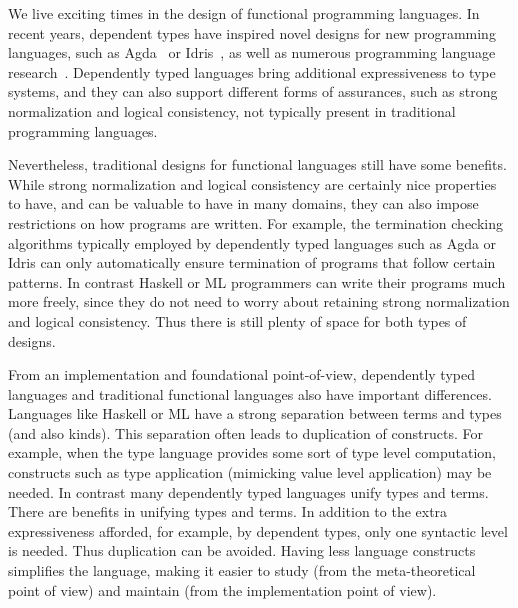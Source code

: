 We live exciting times in the design of functional programming
languages. In recent years, dependent types have inspired novel
designs for new programming languages, such as Agda~\cite{agda} or
Idris~\cite{idris}, as well as numerous programming language research~\cite{cayenne,dep:pisigma,sjoberg:msfp12,guru,fc:kind,zombie:popl14,zombie:popl15}.
Dependently typed languages bring additional expressiveness to type
systems, and they can also support different forms of assurances, such 
as strong normalization and logical consistency, not
typically present in traditional programming languages.
\begin{comment}
 For example,
many dependently typed languages are strongly normalizing and can
ensure termination of programs. Moreover they are typically also
logically consistent, ensuring that programs can be interpreted as
proofs. This is in contrast with traditional functional languages like
Haskell or ML, which have no such additional assurances.
\end{comment}
Nevertheless, traditional designs for functional languages still have
some benefits. While strong normalization and logical consistency are
certainly nice properties to have, and can be valuable to have in many
domains, they can also impose restrictions on how programs are
written. For example, the termination checking algorithms typically employed by
dependently typed languages such as Agda or Idris can only automatically ensure termination
of programs that follow certain patterns.
In contrast Haskell or ML programmers can write their programs much more
freely, since they do not need to worry about retaining strong
normalization and logical consistency. Thus there is still plenty of space
for both types of designs.

From an implementation and foundational point-of-view, dependently
typed languages and traditional functional languages also have
important differences. Languages like Haskell or ML have a strong
separation between terms and types (and also kinds). This separation
often leads to duplication of constructs. For example, when the type
language provides some sort of type level computation, constructs such
as type application (mimicking value level application) may be needed.
In contrast many dependently typed languages unify types and
terms. There are benefits in unifying types and terms.  In
addition to the extra expressiveness afforded, for example, by
dependent types, only one syntactic level is needed. Thus
duplication can be avoided. Having less language constructs
simplifies the language, making
it easier to study (from the meta-theoretical point of view) and maintain
(from the implementation point of view). 

